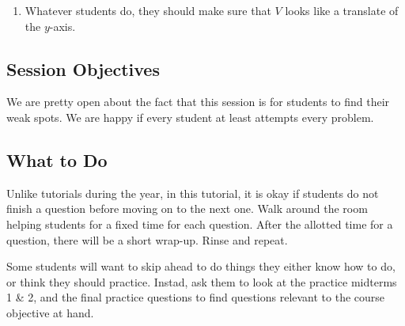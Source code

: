 \documentclass[red]{tutorial}
\newcommand{\mat}[1]{\begin{bmatrix} #1 %
\end{bmatrix}}
\DeclareMathOperator{\Span} {span}
\theoremstyle{definition}
\theoremstyle{theorem}
\begin{document}
{\begin{solutions}
\begin{enumerate*}
\begin{enumerate}
          We express $V$ as a translated span:
          \begin{align*}
            V = \mat{0\\0\\1} + \Span\left\{\mat{0\\1\\0}\right\}
          \end{align*}
        \item
          Whatever students do, they should make sure that $V$ looks like a
          translate of the $y$-axis.
      \end{enumerate}
  \end{enumerate*}
\end{solutions}

\begin{instructions}
  \subsection*{Session Objectives}
  We are pretty open about the fact that this session is for students to find
  their weak spots. We are happy if every student at least attempts every
  problem.

  \subsection*{What to Do}
  Unlike tutorials during the year, in this tutorial, it is okay 
  if students do not finish a question before moving on to the next 
  one. Walk around the room helping students for a fixed time for 
  each question. After the allotted time for a question, there will 
  be a short wrap-up. Rinse and repeat.

  Some students will want to skip ahead to do things they either know how to
  do, or think they should practice. Instad, ask them to look at the 
  practice midterms 1 \& 2, and the final practice questions to find 
  questions relevant to the course objective at hand.

\end{instructions}}
\end{document}
